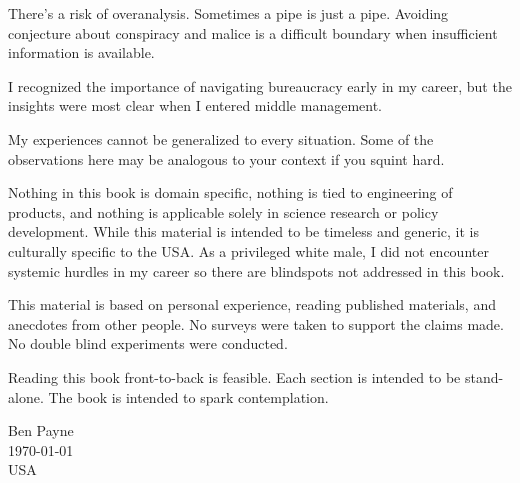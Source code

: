 There's a risk of overanalysis. Sometimes a pipe is just a pipe. Avoiding conjecture about conspiracy and malice is a difficult boundary when insufficient information is available. 

I recognized the importance of navigating bureaucracy early in my career, but the insights were most clear when I entered middle management. 

My experiences cannot be generalized to every situation. Some of the observations here may be analogous to your context if you squint hard. 

Nothing in this book is domain specific, nothing is tied to engineering of products, and nothing is applicable solely in science research or policy development. While this material is intended to be timeless and generic, it is culturally specific to the USA. As a privileged white male, I did not encounter systemic hurdles in my career so there are blindspots not addressed in this book. 

This material is based on personal experience, reading published materials, and anecdotes from other people. No surveys were taken to support the claims made. No double blind experiments were conducted. 

Reading this book front-to-back is feasible. Each section is intended to be stand-alone. The book is intended to spark contemplation. 


\begin{flushright}
Ben Payne\\
\today\\
USA
\end{flushright}


